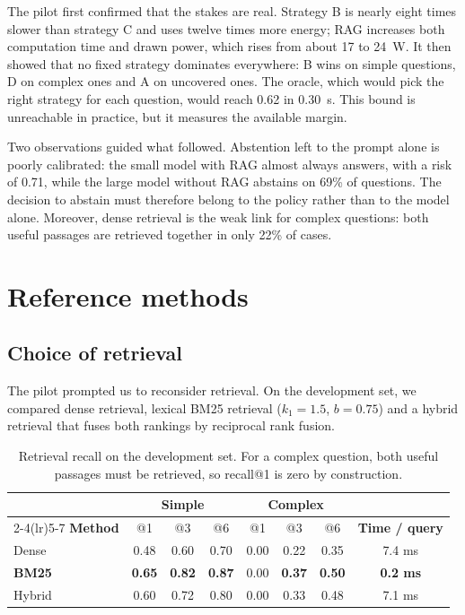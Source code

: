 \documentclass[11pt,a4paper]{article}
\begin{document}
The pilot first confirmed that the stakes are real. Strategy B is nearly eight times slower than
strategy C and uses twelve times more energy; RAG increases both computation time and drawn power, which
rises from about 17 to 24~W. It then showed that no fixed strategy dominates everywhere: B wins on simple
questions, D on complex ones and A on uncovered ones. The oracle, which would pick the right strategy for
each question, would reach 0.62 in 0.30~s. This bound is unreachable in practice, but it measures the
available margin.

Two observations guided what followed. Abstention left to the prompt alone is poorly calibrated: the
small model with RAG almost always answers, with a risk of 0.71, while the large model without RAG
abstains on 69\% of questions. The decision to abstain must therefore belong to the policy rather than
to the model alone. Moreover, dense retrieval is the weak link for complex questions: both useful
passages are retrieved together in only 22\% of cases.

\section{Reference methods}\label{sec:references}

\subsection{Choice of retrieval}

The pilot prompted us to reconsider retrieval. On the development set, we compared dense retrieval,
lexical BM25 retrieval ($k_1 = 1.5$, $b = 0.75$) and a hybrid retrieval that fuses both rankings by
reciprocal rank fusion.

\begin{table}[H]
\centering\small
\begin{tabular}{l c c c c c c c}
\toprule
& \multicolumn{3}{c}{\textbf{Simple}} & \multicolumn{3}{c}{\textbf{Complex}} & \\
\cmidrule(lr){2-4}\cmidrule(lr){5-7}
\textbf{Method} & @1 & @3 & @6 & @1 & @3 & @6 & \textbf{Time / query} \\
\midrule
Dense   & 0.48 & 0.60 & 0.70 & 0.00 & 0.22 & 0.35 & 7.4 ms \\
\textbf{BM25} & \textbf{0.65} & \textbf{0.82} & \textbf{0.87} & 0.00 & \textbf{0.37} & \textbf{0.50} & \textbf{0.2 ms} \\
Hybrid & 0.60 & 0.72 & 0.80 & 0.00 & 0.33 & 0.48 & 7.1 ms \\
\bottomrule
\end{tabular}
\caption{Retrieval recall on the development set. For a complex question, both useful passages must be
retrieved, so recall@1 is zero by construction.}
\label{tab:recherche}
\end{table}
\end{document}
